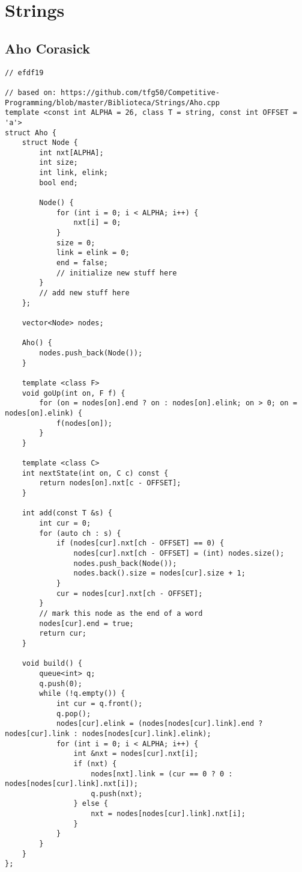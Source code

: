 \documentclass[12pt, a4paper, twoside]{article}
\begin{document}
%
%

\section{Strings}

\subsection{Aho Corasick
}
\begin{lstlisting}
// efdf19

// based on: https://github.com/tfg50/Competitive-Programming/blob/master/Biblioteca/Strings/Aho.cpp
template <const int ALPHA = 26, class T = string, const int OFFSET = 'a'>
struct Aho {
	struct Node {
		int nxt[ALPHA];
		int size;
		int link, elink;
		bool end;

		Node() {
			for (int i = 0; i < ALPHA; i++) {
				nxt[i] = 0;
			}
			size = 0;
			link = elink = 0;
			end = false;
			// initialize new stuff here
		}
		// add new stuff here
	};

	vector<Node> nodes;

	Aho() {
		nodes.push_back(Node());
	}

	template <class F>
	void goUp(int on, F f) {
		for (on = nodes[on].end ? on : nodes[on].elink; on > 0; on = nodes[on].elink) {
			f(nodes[on]);
		}
	}

	template <class C>
	int nextState(int on, C c) const {
		return nodes[on].nxt[c - OFFSET];
	}

	int add(const T &s) {
		int cur = 0;
		for (auto ch : s) {
			if (nodes[cur].nxt[ch - OFFSET] == 0) {
				nodes[cur].nxt[ch - OFFSET] = (int) nodes.size();
				nodes.push_back(Node());
				nodes.back().size = nodes[cur].size + 1;
			}
			cur = nodes[cur].nxt[ch - OFFSET];
		}
		// mark this node as the end of a word
		nodes[cur].end = true;
		return cur;
	}

	void build() {
		queue<int> q;
		q.push(0);
		while (!q.empty()) {
			int cur = q.front();
			q.pop();
			nodes[cur].elink = (nodes[nodes[cur].link].end ? nodes[cur].link : nodes[nodes[cur].link].elink);
			for (int i = 0; i < ALPHA; i++) {
				int &nxt = nodes[cur].nxt[i];
				if (nxt) {
					nodes[nxt].link = (cur == 0 ? 0 : nodes[nodes[cur].link].nxt[i]);
					q.push(nxt);
				} else {
					nxt = nodes[nodes[cur].link].nxt[i];
				}
			}
		}
	}
};
\end{lstlisting}
\end{document}
